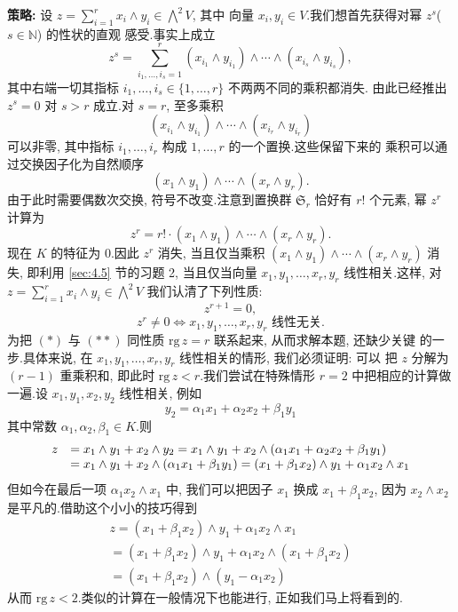 \noindent\textbf{策略:} 设 $z = \sum_{i=1}^{r} x_i \wedge y_i \in \bigwedge^2 V$, 其中
向量 $x_i, y_i \in V$.我们想首先获得对幂 $z^s$($s \in \mathbb{N}$) 的性状的直观
感受.事实上成立
\[
z^s = \sum_{i_1, \ldots, i_s = 1}^{r} (x_{i_1} \wedge y_{i_1}) \wedge \cdots \wedge (x_{i_s} \wedge y_{i_s}),
\]
其中右端一切其指标 $i_1, \ldots, i_s \in \{1, \ldots, r\}$ 不两两不同的乘积都消失.
由此已经推出 $z^s = 0$ 对 $s > r$ 成立.对 $s = r$, 至多乘积
\[
(x_{i_1} \wedge y_{i_1}) \wedge \cdots \wedge (x_{i_r} \wedge y_{i_r})
\]
可以非零, 其中指标 $i_1, \ldots, i_r$ 构成 $1, \ldots, r$ 的一个置换.这些保留下来的
乘积可以通过交换因子化为自然顺序
\[
(x_1 \wedge y_1) \wedge \cdots \wedge (x_r \wedge y_r)\text{.}
\]
由于此时需要偶数次交换, 符号不改变.注意到置换群 $\mathfrak{S}_r$ 恰好有 $r!$ 个元素,
幂 $z^r$ 计算为
\[
z^r = r! \cdot (x_1 \wedge y_1) \wedge \cdots \wedge (x_r \wedge y_r)\text{.}
\]
现在 $K$ 的特征为 $0$.因此 $z^r$ 消失, 当且仅当乘积 $(x_1 \wedge y_1) \wedge \cdots
\wedge (x_r \wedge y_r)$ 消失, 即利用 \ref{sec:4.5} 节的习题 2, 当且仅当向量 $x_1, y_1, \ldots,
x_r, y_r$ 线性相关.这样, 对 $z = \sum_{i=1}^{r} x_i \wedge y_i \in \bigwedge^2 V$
我们认清了下列性质:
\begin{equation}
z^{r+1} = 0, \tag{$\ast$}
\end{equation}
\begin{equation}
z^r \neq 0 \iff x_1, y_1, \ldots, x_r, y_r \text{ 线性无关.} \tag{$\ast\ast$}
\end{equation}
为把 $(*)$ 与 $(**)$ 同性质 $\mathrm{rg}\, z = r$ 联系起来, 从而求解本题, 还缺少关键
的一步.具体来说, 在 $x_1, y_1, \ldots, x_r, y_r$ 线性相关的情形, 我们必须证明: 可以
把 $z$ 分解为 $(r - 1)$ 重乘积和, 即此时 $\mathrm{rg}\, z < r$.我们尝试在特殊情形
$r = 2$ 中把相应的计算做一遍.设 $x_1, y_1, x_2, y_2$ 线性相关, 例如
\[
y_2 = \alpha_1 x_1 + \alpha_2 x_2 + \beta_1 y_1
\]
其中常数 $\alpha_1, \alpha_2, \beta_1 \in K$.则
\[
\begin{array}{r l}
z & = x_1 \wedge y_1 + x_2 \wedge y_2 = x_1 \wedge y_1 + x_2 \wedge (\alpha_1 x_1 + \alpha_2 x_2 + \beta_1 y_1) \\
& = x_1 \wedge y_1 + x_2 \wedge (\alpha_1 x_1 + \beta_1 y_1) = (x_1 + \beta_1 x_2) \wedge y_1 + \alpha_1 x_2 \wedge x_1
\end{array}
\]
但如今在最后一项 $\alpha_1 x_2 \wedge x_1$ 中, 我们可以把因子 $x_1$ 换成 $x_1 +
\beta_1 x_2$, 因为 $x_2 \wedge x_2$ 是平凡的.借助这个小小的技巧得到
\[
\begin{array}{l}
z = (x_1 + \beta_1 x_2) \wedge y_1 + \alpha_1 x_2 \wedge x_1 \\
= (x_1 + \beta_1 x_2) \wedge y_1 + \alpha_1 x_2 \wedge (x_1 + \beta_1 x_2) \\
= (x_1 + \beta_1 x_2) \wedge (y_1 - \alpha_1 x_2)
\end{array}
\]
从而 $\mathrm{rg}\, z < 2$.类似的计算在一般情况下也能进行, 正如我们马上将看到的.

